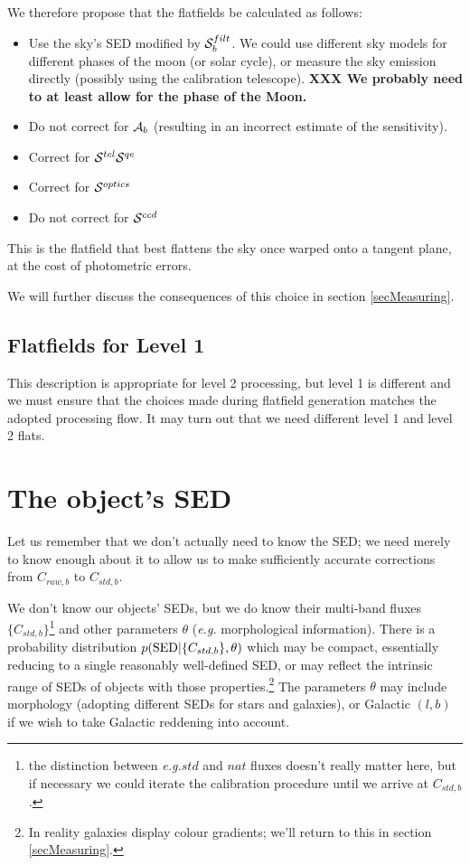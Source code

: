 \documentclass[12pt]{article}
\newcommand{\eg}{\textit{e.g.}\xspace}
\newcommand{\additive}{{\cal A}}
\newcommand{\qe}{{\cal S}}
\newcommand{\XXX}[1]{\textbf{XXX #1}\xspace}
\begin{document}
We therefore propose that the flatfields be calculated as follows:
\begin{itemize}
  \item Use the sky's SED modified by $\qe_b^{filt}$. We could use different sky models for different phases
    of the moon (or solar cycle), or measure the sky emission directly (possibly using the calibration
    telescope). \XXX{We probably need to at least allow for the phase of the Moon.}

  \item Do not correct for $\additive_b$ (resulting in an incorrect estimate of the sensitivity).

  \item Correct for $\qe^{tel} \qe^{qe}$

  \item Correct for $\qe^{optics}$

  \item Do not correct for $\qe^{ccd}$
\end{itemize}
This is the flatfield that best flattens the sky once warped onto a tangent plane,
at the cost of photometric errors.

We will further discuss the consequences of this choice in section \ref{secMeasuring}.

\subsection{Flatfields for Level 1}

This description is appropriate for level 2 processing, but level 1 is different and we must ensure that the
choices made during flatfield generation matches the adopted processing flow.  It may turn out that we need
different level 1 and level 2 flats.

\section{The object's SED}
\label{secSED}

Let us remember that we don't actually need to know the SED; we need merely to know enough about it to allow
us to make sufficiently accurate corrections from $C_{raw, b}$ to $C_{std, b}$.

We don't know our objects' SEDs, but we do know their multi-band fluxes $\{C_{std,b}\}$\footnote{
  the distinction between \eg $std$ and $nat$ fluxes doesn't really matter here,  but if necessary
  we could iterate the calibration procedure until we arrive at $C_{std, b}$.
  }
and other parameters
$\theta$ (\eg morphological information).  There is a probability distribution
$p({\rm SED}|\{C_{std, b}\}, \theta)$ which
may be compact, essentially reducing to a single reasonably well-defined SED, or may reflect the intrinsic
range of SEDs of objects with those properties.\footnote{
  In reality galaxies display colour gradients; we'll return to this in section \ref{secMeasuring}.
}
The parameters $\theta$ may include morphology (adopting different SEDs for stars and galaxies), or
Galactic $(l, b)$ if we wish to take Galactic reddening into account.
\end{document}
